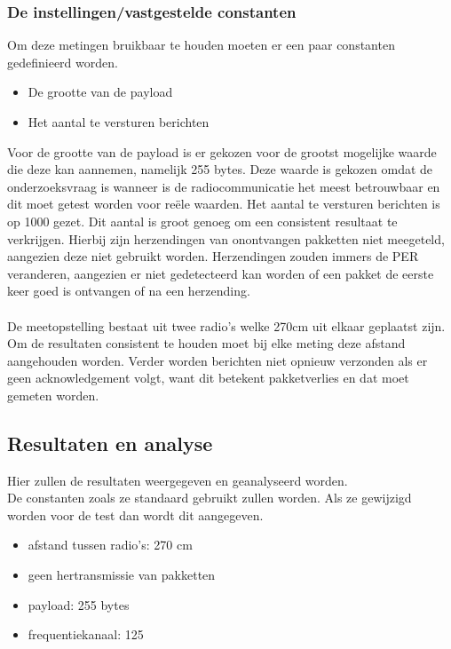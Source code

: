 \documentclass{article}
\begin{document}
\subsubsection{De instellingen/vastgestelde constanten}
Om deze metingen bruikbaar te houden moeten er een paar constanten gedefinieerd worden.
\begin{itemize}
	\item De grootte van de payload
	\item Het aantal te versturen berichten
\end{itemize}

Voor de grootte van de payload is er gekozen voor de grootst mogelijke waarde die deze kan aannemen, namelijk 255 bytes. Deze waarde is gekozen omdat de onderzoeksvraag is wanneer is de radiocommunicatie het meest betrouwbaar en dit moet getest worden voor re\"{e}le waarden. 
Het aantal te versturen berichten is op 1000 gezet. Dit aantal is groot genoeg om een consistent resultaat te verkrijgen. Hierbij zijn herzendingen van onontvangen pakketten niet meegeteld, aangezien deze niet gebruikt worden. Herzendingen zouden immers de PER veranderen, aangezien er niet gedetecteerd kan worden of een pakket de eerste keer goed is ontvangen of na een herzending.
\\
\\
De meetopstelling bestaat uit twee radio's welke 270cm uit elkaar geplaatst zijn. Om de resultaten consistent te houden moet bij elke meting deze afstand aangehouden worden. 
Verder worden berichten niet opnieuw verzonden als er geen acknowledgement volgt, want dit betekent pakketverlies en dat moet gemeten worden. 

\subsection{Resultaten en analyse}
Hier zullen de resultaten weergegeven en geanalyseerd worden. \\
  De constanten zoals ze standaard gebruikt zullen worden. Als ze gewijzigd worden voor de test dan wordt dit aangegeven. 
  \begin{itemize}
  	\item afstand tussen radio's: 270 cm
  	\item geen hertransmissie van pakketten
  	\item payload: 255 bytes
  	\item frequentiekanaal: 125
  \end{itemize}
  
\end{document}
